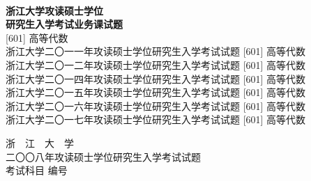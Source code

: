 \documentclass[UTF8,a4paper,11pt]{article}
\begin{document}
\begin{center}
	\mbox{}\\
	{\Huge\bf 浙江大学攻读硕士学位\\
		研究生入学考试业务课试题\\}
	{\huge [601] 高等代数}\\
	浙江大学二〇一一年攻读硕士学位研究生入学考试试题 [601] 高等代数\\
	浙江大学二〇一二年攻读硕士学位研究生入学考试试题 [601] 高等代数\\
	浙江大学二〇一四年攻读硕士学位研究生入学考试试题 [601] 高等代数\\
	浙江大学二〇一五年攻读硕士学位研究生入学考试试题 [601] 高等代数\\
	浙江大学二〇一六年攻读硕士学位研究生入学考试试题 [601] 高等代数\\
	浙江大学二〇一七年攻读硕士学位研究生入学考试试题 [601] 高等代数\\
	\vspace{4em}
	\mbox{}
\end{center}
\newpage
\setcounter{page}{1}

\begin{center}
	{\Huge 浙~~江~~大~~学}\\
	\setlength{\parskip}{5pt}
	{\Large 二〇〇八年攻读硕士学位研究生入学考试试题}\\
	\setlength{\parskip}{10 pt}
	{\Large 考试科目\underline{} 编号\underline{}}
\end{center}
\end{document}
